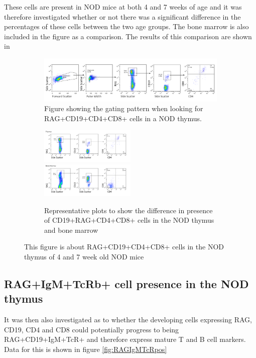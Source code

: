 These cells are present in NOD mice at both 4 and 7 weeks of age and it was therefore investigated whether or not there was a significant difference in the percentages of these cells between the two age groups. 
The bone marrow is also included in the figure as a comparison.
The results of this comparison are shown in 


\begin{figure}	
	\begin{subfigure}{\textwidth}
		\includegraphics[width=\textwidth] {Figures/CD19+RAG+DPgating.png}
		\caption{Figure showing the gating pattern when looking for RAG+CD19+CD4+CD8+ cells in a NOD thymus.}
		\label{fig:RAGposDP}
	\end{subfigure}
	\begin{subfigure}{\textwidth}
	\includegraphics[width=0.5\textwidth]{Figures/Thymus1RAGCD19DP.png}
	\includegraphics[width=0.5\textwidth]{Figures/BM1RAGCD19DP.png}
	\caption{Representative plots to show the difference in presence of CD19+RAG+CD4+CD8+ cells in the NOD thymus and bone marrow}
	\label{subfig:BMvsThyRAGCD19DP}
	\end{subfigure}
\caption{This figure is about RAG+CD19+CD4+CD8+ cells in the NOD thymus of 4 and 7 week old NOD mice}
\label{fig:RAGCD19CD4CD8pos}
\end{figure}



\subsection{RAG+IgM+TcRb+ cell presence in the NOD thymus}
It was then also investigated as to whether the developing cells expressing RAG, CD19, CD4 and CD8 could potentially progress to being RAG+CD19+IgM+TcR+ and therefore express mature T and B cell markers.
Data for this is shown in figure \cref{fig:RAGIgMTcRpos}

